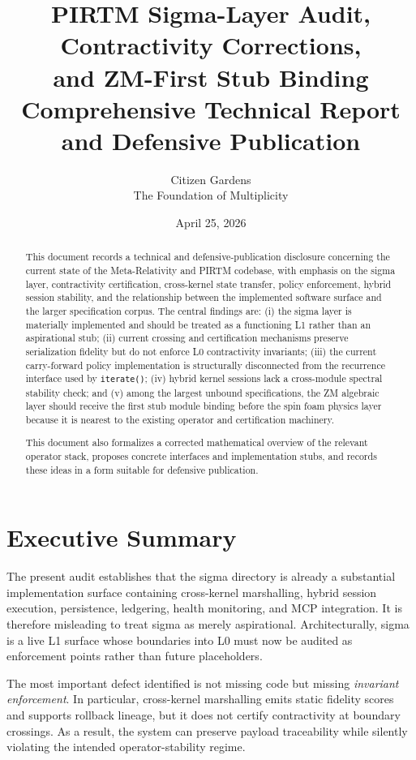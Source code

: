 \documentclass[11pt]{article}
\title{\textbf{PIRTM Sigma-Layer Audit, Contractivity Corrections,\\
and ZM-First Stub Binding}\\[0.5em]
\large Comprehensive Technical Report and Defensive Publication}
\author{Citizen Gardens \\ The Foundation of Multiplicity}
\date{April 25, 2026}
\begin{document}
\maketitle
\thispagestyle{fancy}

\begin{abstract}
This document records a technical and defensive-publication disclosure concerning the current state of the Meta-Relativity and PIRTM codebase, with emphasis on the sigma layer, contractivity certification, cross-kernel state transfer, policy enforcement, hybrid session stability, and the relationship between the implemented software surface and the larger specification corpus. The central findings are: (i) the sigma layer is materially implemented and should be treated as a functioning L1 rather than an aspirational stub; (ii) current crossing and certification mechanisms preserve serialization fidelity but do not enforce L0 contractivity invariants; (iii) the current carry-forward policy implementation is structurally disconnected from the recurrence interface used by \texttt{iterate()}; (iv) hybrid kernel sessions lack a cross-module spectral stability check; and (v) among the largest unbound specifications, the ZM algebraic layer should receive the first stub module binding before the spin foam physics layer because it is nearest to the existing operator and certification machinery.

This document also formalizes a corrected mathematical overview of the relevant operator stack, proposes concrete interfaces and implementation stubs, and records these ideas in a form suitable for defensive publication.
\end{abstract}
\newpage
\tableofcontents
\newpage

\section{Executive Summary}

The present audit establishes that the sigma directory is already a substantial implementation surface containing cross-kernel marshalling, hybrid session execution, persistence, ledgering, health monitoring, and MCP integration. It is therefore misleading to treat sigma as merely aspirational. Architecturally, sigma is a live L1 surface whose boundaries into L0 must now be audited as enforcement points rather than future placeholders.

The most important defect identified is not missing code but missing \emph{invariant enforcement}. In particular, cross-kernel marshalling emits static fidelity scores and supports rollback lineage, but it does not certify contractivity at boundary crossings. As a result, the system can preserve payload traceability while silently violating the intended operator-stability regime.
\end{document}

